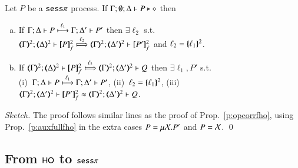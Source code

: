 \begin{proposition}
\label{p:auxfullfho}
Let $P$ be a  $\sessp$ process.
If $\Gamma; \emptyset; \Delta \proves P \hastype \Proc$ then
		\begin{enumerate}[a)]
			\item	 
			   If  $\stytra{\Gamma}{\ell_1}{\Delta}{P}{\Delta'}{P'}$
			   then  $\exists \ell_2$ s.t. \\
			    $\wtytra{\mapt{\Gamma}^{2}}{\ell_2}{\mapt{\Delta}^{2}}{\map{P}_f^{2}}{\mapt{\Delta'}^{2}}{\map{P'}_f^{2}}$
			    and $\ell_2 = \mapa{\ell_1}^{2}$.
			\item   
			If  $\wtytra{\mapt{\Gamma}^{2}}{\ell_2}{\mapt{\Delta}^{2}}{\map{P}^{2}_f}{\mapt{\Delta'}^{2}}{Q}$
			   then $\exists \ell_1, P'$ s.t.  \\
			    (i)~$\stytra{\Gamma}{\ell_1}{\Delta}{P}{\Delta'}{P'}$,
			    (ii)~$\ell_2 = \mapa{\ell_1}^{2}$, 
			    (iii)~$\wbb{\mapt{\Gamma}^{2}}{\ell}{\mapt{\Delta'}^{2}}{\map{P'}_f^{2}}{\mapt{\Delta'}^{2}}{Q}$.
			    \end{enumerate}
\end{proposition}

\begin{proof}[Sketch]
The proof follows similar lines as the proof of Prop.~\ref{p:opcorrfho},
using 
Prop.~\ref{p:auxfullfho} in the extra cases $P =\recp{X}{P'}$ and $P = \rvar{X}$.
	\qed
\end{proof}

\subsection{From $\HO$ to $\sessp$}\label{ss:hotofo}

